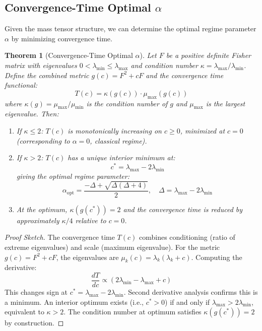 \documentclass[11pt,a4paper]{article}
\theoremstyle{plain}
\newtheorem{theorem}{Theorem}[section]
\theoremstyle{definition}
\theoremstyle{remark}
\begin{document}
\subsection{Convergence-Time Optimal $\alpha$}

Given the mass tensor structure, we can determine the optimal regime parameter $\alpha$ by minimizing convergence time.

\begin{theorem}[Convergence-Time Optimal $\alpha$]
\label{thm:optimal_alpha}
Let $F$ be a positive definite Fisher matrix with eigenvalues $0 < \lambda_{\min} \leq \lambda_{\max}$ and condition number $\kappa = \lambda_{\max}/\lambda_{\min}$. Define the combined metric $g(c) = F^2 + cF$ and the convergence time functional:
\begin{equation}
T(c) = \kappa(g(c)) \cdot \mu_{\max}(g(c))
\end{equation}
where $\kappa(g) = \mu_{\max}/\mu_{\min}$ is the condition number of $g$ and $\mu_{\max}$ is the largest eigenvalue. Then:

\begin{enumerate}[noitemsep]
\item If $\kappa \leq 2$: $T(c)$ is monotonically increasing on $c \geq 0$, minimized at $c = 0$ (corresponding to $\alpha = 0$, classical regime).

\item If $\kappa > 2$: $T(c)$ has a unique interior minimum at:
\begin{equation}
c^* = \lambda_{\max} - 2\lambda_{\min}
\end{equation}
giving the optimal regime parameter:
\begin{equation}
\alpha_{\mathrm{opt}} = \frac{-\Delta + \sqrt{\Delta(\Delta + 4)}}{2}, \quad \Delta = \lambda_{\max} - 2\lambda_{\min}
\end{equation}

\item At the optimum, $\kappa(g(c^*)) = 2$ and the convergence time is reduced by approximately $\kappa/4$ relative to $c = 0$.
\end{enumerate}
\end{theorem}

\begin{proof}[Proof Sketch]
The convergence time $T(c)$ combines conditioning (ratio of extreme eigenvalues) and scale (maximum eigenvalue). For the metric $g(c) = F^2 + cF$, the eigenvalues are $\mu_k(c) = \lambda_k(\lambda_k + c)$. Computing the derivative:
\begin{equation}
\frac{dT}{dc} \propto (2\lambda_{\min} - \lambda_{\max} + c)
\end{equation}
This changes sign at $c^* = \lambda_{\max} - 2\lambda_{\min}$. Second derivative analysis confirms this is a minimum. An interior optimum exists (i.e., $c^* > 0$) if and only if $\lambda_{\max} > 2\lambda_{\min}$, equivalent to $\kappa > 2$. The condition number at optimum satisfies $\kappa(g(c^*)) = 2$ by construction.
\end{proof}
\end{document}
